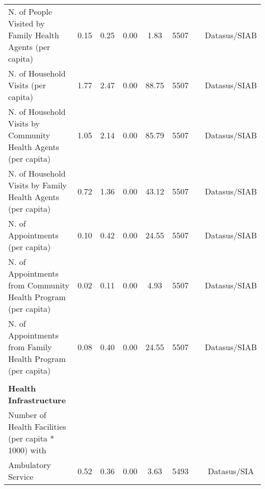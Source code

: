 \begin{table}[H]
\begin{footnotesize}
\begin{center}
{\begin{threeparttable}[b]
\begin{tabular}{rrrrrrrr}
    \multicolumn{1}{l}{N. of People Visited by Family Health Agents (per capita)} & \multicolumn{1}{c}{0.15} & \multicolumn{1}{c}{0.25} & \multicolumn{1}{c}{0.00} & \multicolumn{1}{c}{1.83} & \multicolumn{1}{c}{5507} &       & \multicolumn{1}{c}{Datasus/SIAB} \\
    \multicolumn{1}{l}{N. of Household Visits (per capita)} & \multicolumn{1}{c}{1.77} & \multicolumn{1}{c}{2.47} & \multicolumn{1}{c}{0.00} & \multicolumn{1}{c}{88.75} & \multicolumn{1}{c}{5507} &       & \multicolumn{1}{c}{Datasus/SIAB} \\
    \multicolumn{1}{l}{N. of Household Visits by Community Health Agents (per capita)} & \multicolumn{1}{c}{1.05} & \multicolumn{1}{c}{2.14} & \multicolumn{1}{c}{0.00} & \multicolumn{1}{c}{85.79} & \multicolumn{1}{c}{5507} &       & \multicolumn{1}{c}{Datasus/SIAB} \\
    \multicolumn{1}{l}{N. of Household Visits by Family Health Agents (per capita)} & \multicolumn{1}{c}{0.72} & \multicolumn{1}{c}{1.36} & \multicolumn{1}{c}{0.00} & \multicolumn{1}{c}{43.12} & \multicolumn{1}{c}{5507} &       & \multicolumn{1}{c}{Datasus/SIAB} \\
    \multicolumn{1}{l}{N. of Appointments (per capita)} & \multicolumn{1}{c}{0.10} & \multicolumn{1}{c}{0.42} & \multicolumn{1}{c}{0.00} & \multicolumn{1}{c}{24.55} & \multicolumn{1}{c}{5507} &       & \multicolumn{1}{c}{Datasus/SIAB} \\
    \multicolumn{1}{l}{N. of Appointments from Community Health Program (per capita)} & \multicolumn{1}{c}{0.02} & \multicolumn{1}{c}{0.11} & \multicolumn{1}{c}{0.00} & \multicolumn{1}{c}{4.93} & \multicolumn{1}{c}{5507} &       & \multicolumn{1}{c}{Datasus/SIAB} \\
    \multicolumn{1}{l}{N. of Appointments from Family Health Program (per capita)} & \multicolumn{1}{c}{0.08} & \multicolumn{1}{c}{0.40} & \multicolumn{1}{c}{0.00} & \multicolumn{1}{c}{24.55} & \multicolumn{1}{c}{5507} &       & \multicolumn{1}{c}{Datasus/SIAB} \\
          &       &       &       &       &       &       &  \\
    \multicolumn{1}{l}{\textbf{Health Infrastructure}} &       &       &       &       &       &       &  \\
    \multicolumn{1}{l}{Number of Health Facilities (per capita * 1000) with} &       &       &       &       &       &       &  \\
    \multicolumn{1}{l}{Ambulatory Service} & \multicolumn{1}{c}{0.52} & \multicolumn{1}{c}{0.36} & \multicolumn{1}{c}{0.00} & \multicolumn{1}{c}{3.63} & \multicolumn{1}{c}{5493} &       & \multicolumn{1}{c}{Datasus/SIA} \\

\end{tabular}
\end{threeparttable}}
\end{center}
\end{footnotesize}
\end{table}

